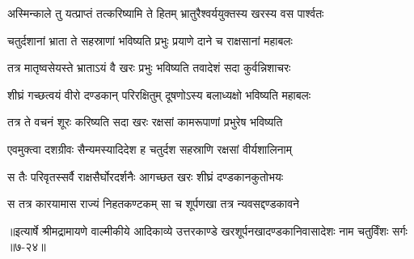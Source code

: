 \twolineshloka
{अस्मिन्काले तु यत्प्राप्तं तत्करिष्यामि ते हितम्}
{भ्रातुरैश्वर्ययुक्तस्य खरस्य वस पार्श्वतः} %

\twolineshloka
{चतुर्दशानां भ्राता ते सहस्राणां भविष्यति}
{प्रभुः प्रयाणे दाने च राक्षसानां महाबलः} %

\twolineshloka
{तत्र मातृष्वसेयस्ते भ्राताऽयं वै खरः प्रभुः}
{भविष्यति तवादेशं सदा कुर्वन्निशाचरः} %

\twolineshloka
{शीघ्रं गच्छत्वयं वीरो दण्डकान् परिरक्षितुम्}
{दूषणोऽस्य बलाध्यक्षो भविष्यति महाबलः} %

\twolineshloka
{तत्र ते वचनं शूरः करिष्यति सदा खरः}
{रक्षसां कामरूपाणां प्रभुरेष भविष्यति} %

\twolineshloka
{एवमुक्त्वा दशग्रीवः सैन्यमस्यादिदेश ह}
{चतुर्दश सहस्राणि रक्षसां वीर्यशालिनाम्} %

\twolineshloka
{स तैः परिवृतस्सर्वै राक्षसैर्घोरदर्शनैः}
{आगच्छत खरः शीघ्रं दण्डकानकुतोभयः} %

\twolineshloka
{स तत्र कारयामास राज्यं निहतकण्टकम्}
{सा च शूर्पणखा तत्र न्यवसद्दण्डकावने} %


॥इत्यार्षे श्रीमद्रामायणे वाल्मीकीये आदिकाव्ये उत्तरकाण्डे खरशूर्पनखादण्डकानिवासादेशः नाम चतुर्विंशः सर्गः ॥७-२४॥
